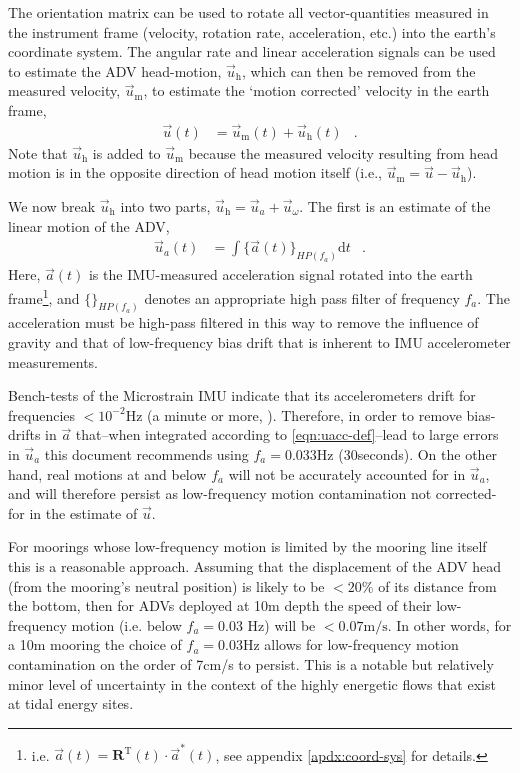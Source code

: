 \documentclass[twocol]{ametsoc}
\def\earth{}
\def\omatinv{\ensuremath{\mathbf{R}^\mathrm{T}}}
\def\ue{\ensuremath{\vec{u}\earth}}
\def\uacc{\ensuremath{\ue_a}}
\def\ue{\ensuremath{\vec{u}\earth}}
\def\um{\ensuremath{\ue_\mathrm{h}}}
\def\uadv{\ensuremath{\ue_\mathrm{m}}}
\def\urot{\ensuremath{\ue_\omega}}
\def\uacc{\ensuremath{\ue_a}}
\begin{document}
The orientation matrix can be used to rotate all vector-quantities measured in the instrument frame (velocity, rotation rate, acceleration, etc.) into the earth's coordinate system. 
The angular rate and linear acceleration signals can be used to estimate the ADV head-motion, $\um$, which can then be removed from the measured velocity, $\uadv$, to estimate the `motion corrected' velocity in the earth frame,
\begin{align}
  \label{eqn:u_mot_def}
  \ue(t) & = \uadv(t) + \um(t) &  .
\end{align}
Note that $\um$ is added to $\uadv$ because the measured velocity resulting from head motion is in the opposite direction of head motion itself (i.e., $\uadv = \ue - \um$).

We now break $\um$ into two parts, $ \um  =  \uacc + \urot $.
The first is an estimate of the linear motion of the ADV,
\begin{align}
\label{eqn:uacc-def}
  \uacc(t) & = \int \{\vec{a}\earth(t)\}_{HP(f_{a})} \mathrm{d}t & .
\end{align}
Here, $\vec{a}\earth(t)$ is the IMU-measured acceleration signal rotated into the earth frame\footnote{i.e. $\vec{a}\earth (t) = \omatinv(t) \cdot \vec{a}^*(t)$, see appendix \ref{apdx:coord-sys} for details.}, and $\{\}_{HP(f_{a})}$ denotes an appropriate high pass filter of frequency $f_a$. The acceleration must be high-pass filtered in this way to remove the influence of gravity and that of low-frequency bias drift that is inherent to IMU accelerometer measurements.  

Bench-tests of the Microstrain IMU indicate that its accelerometers drift for frequencies $<10^{-2}$Hz (a minute or more, \cite{EgelandPhD2014}).  Therefore, in order to remove bias-drifts in $\vec{a}$ that--when integrated according to \eqref{eqn:uacc-def}--lead to large errors in $\uacc$ this document recommends using $f_a = 0.033$Hz (30seconds). 
On the other hand, real motions at and below $f_a$ will not be accurately accounted for in $\uacc$, and will therefore persist as low-frequency motion contamination not corrected-for in the estimate of $\vec{u}$. 

For moorings whose low-frequency motion is limited by the mooring line itself this is a reasonable approach.  
Assuming that the displacement of the ADV head (from the mooring's neutral position) is likely to be  $< 20 \% $ of its distance from the bottom, then for ADVs deployed at 10m depth the speed of their low-frequency motion (i.e. below $ f_a = 0.03 $ Hz) will be $<0.07 \mathrm{m/s} $.  In other words, for a 10m mooring the choice of $f_a = 0.03$Hz allows for low-frequency motion contamination on the order of 7cm/s to persist.  This is a notable but relatively minor level of uncertainty in the context of the highly energetic flows that exist at tidal energy sites.
\end{document}

